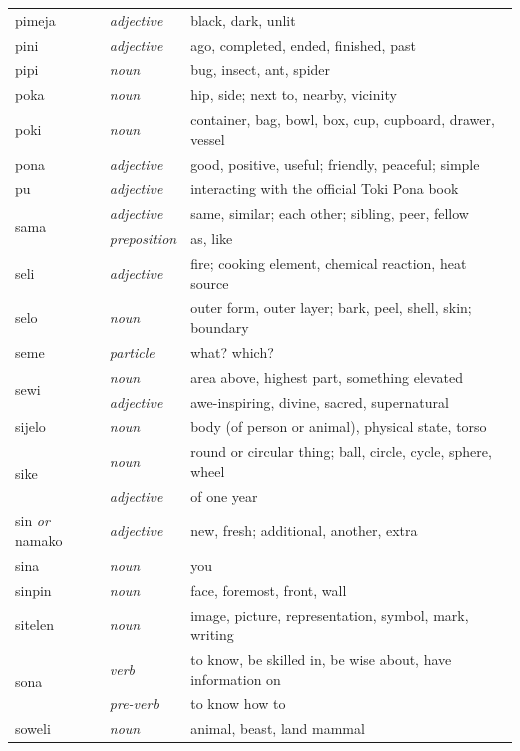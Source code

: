 \documentclass[14pt, a4paper]{extreport}
\begin{document}
\begin{longtable}{llp{10cm}}
  pimeja & \textit{adjective} & black, dark, unlit \\
  pini & \textit{adjective} & ago, completed, ended, finished, past \\
  pipi & \textit{noun} & bug, insect, ant, spider \\
  poka & \textit{noun} & hip, side; next to, nearby, vicinity \\
  poki & \textit{noun} & container, bag, bowl, box, cup, cupboard, drawer, vessel \\
  pona & \textit{adjective} & good, positive, useful; friendly, peaceful; simple \\
  pu & \textit{adjective} & interacting with the official Toki Pona book \\
  \multirow[t]{2}{*}{sama} & \textit{adjective} & same, similar; each other; sibling, peer, fellow \\
  & \textit{preposition} & as, like \\
  seli & \textit{adjective} & fire; cooking element, chemical reaction, heat source \\
  selo & \textit{noun} & outer form, outer layer; bark, peel, shell, skin; boundary \\
  seme & \textit{particle} & what? which? \\
  \multirow[t]{2}{*}{sewi} & \textit{noun} & area above, highest part, something elevated \\
  & \textit{adjective} & awe-inspiring, divine, sacred, supernatural \\
  sijelo & \textit{noun} & body (of person or animal), physical state, torso \\
  \multirow[t]{2}{*}{sike} & \textit{noun} & round or circular thing; ball, circle, cycle, sphere, wheel \\
  & \textit{adjective} & of one year \\
  sin \textit{or} namako & \textit{adjective} & new, fresh; additional, another, extra \\
  sina & \textit{noun} & you \\
  sinpin & \textit{noun} & face, foremost, front, wall \\
  sitelen & \textit{noun} & image, picture, representation, symbol, mark, writing \\
  \multirow[t]{2}{*}{sona} & \textit{verb} & to know, be skilled in, be wise about, have information on \\
  & \textit{pre-verb} & to know how to \\
  soweli & \textit{noun} & animal, beast, land mammal \\

\end{longtable}
\end{document}
